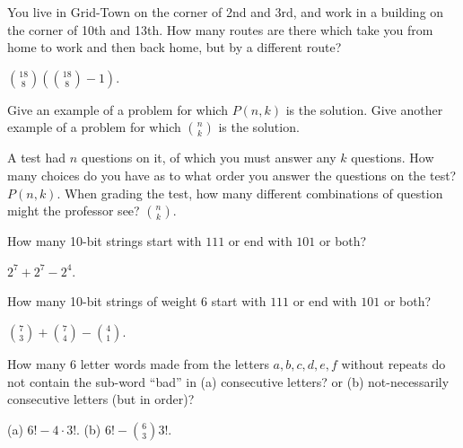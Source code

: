 \begin{questions}
	


\question You live in Grid-Town on the corner of 2nd and 3rd, and work in a building on the corner of 10th and 13th.  How many routes are there which take you from home to work and then back home, but by a different route?

	\begin{answer}
		 ${18 \choose 8}\left({18 \choose 8} - 1\right)$. 
	\end{answer}
	
	


\question Give an example of a problem for which $P(n,k)$ is the solution.  Give another example of a problem for which ${n\choose k}$ is the solution.

	\begin{answer}
		 A test had $n$ questions on it, of which you must answer any $k$ questions.  How many choices do you have as to what order you answer the questions on the test?  $P(n,k)$.  When grading the test, how many different combinations of question might the professor see?  ${n \choose k}$.
	\end{answer}
	
	


%
	
	


\question How many 10-bit strings start with $111$ or end with $101$ or both?

	\begin{answer}
		 $2^7 + 2^7 - 2^4$.
	\end{answer}
	
	


\question How many 10-bit strings of weight 6 start with $111$ or end with $101$ or both?

	\begin{answer}
		${7 \choose 3} + {7 \choose 4} - {4 \choose 1}$.
	\end{answer}
	
	


\question How many 6 letter words made from the letters $a,b,c,d,e,f$ without repeats do not contain the sub-word ``bad'' in (a) consecutive letters? or (b) not-necessarily consecutive letters (but in order)? 

	\begin{answer}
		(a) $6! - 4\cdot 3!$.  (b) $6! - {6 \choose 3}3!$.
	\end{answer}
	

\end{questions}
